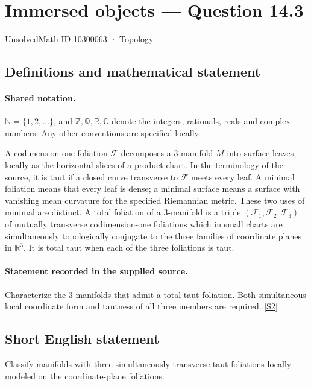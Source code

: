\documentclass[11pt]{article}
\newcommand{\sref}[2]{\hyperlink{source:#1:#2}{[S#2]}}
\begin{document}
\setcounter{section}{10300062}
\section{Immersed objects — Question 14.3}\label{10300063}
{\small\sffamily UnsolvedMath ID 10300063 · Topology}
\subsection{Definitions and mathematical statement}

\paragraph{Shared notation.}$\mathbb N=\{1,2,\ldots\}$, and $\mathbb Z,\mathbb Q,\mathbb R,\mathbb C$ denote the integers, rationals, reals and complex numbers. Any other conventions are specified locally.


A codimension-one foliation $\mathcal F$ decomposes a $3$-manifold $M$ into surface leaves, locally as the horizontal slices of a product chart. In the terminology of the source, it is taut if a closed curve transverse to $\mathcal F$ meets every leaf. A minimal foliation means that every leaf is dense; a minimal surface means a surface with vanishing mean curvature for the specified Riemannian metric. These two uses of minimal are distinct. A total foliation of a $3$-manifold is a triple $(\mathcal F_1,\mathcal F_2,\mathcal F_3)$ of mutually transverse codimension-one foliations which in small charts are simultaneously topologically conjugate to the three families of coordinate planes in $\mathbb R^3$. It is total taut when each of the three foliations is taut.
\paragraph{Statement recorded in the supplied source.}
Characterize the $3$-manifolds that admit a total taut foliation. Both simultaneous local coordinate form and tautness of all three members are required. \sref{10300063}{2}
\subsection{Short English statement}
Classify manifolds with three simultaneously transverse taut foliations locally modeled on the coordinate-plane foliations.
\end{document}
